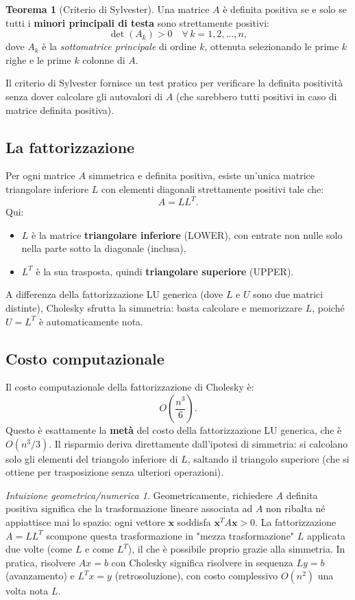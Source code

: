 \documentclass[a4paper,12pt]{article}
\theoremstyle{definition}
\newtheorem{teorema}{Teorema}[section]
\theoremstyle{remark}
\newtheorem*{intuizione}{Intuizione geometrica/numerica}
\begin{document}
\begin{teorema}[Criterio di Sylvester]
Una matrice $A$ è definita positiva se e solo se tutti i \textbf{minori principali di testa} sono
strettamente positivi:
\[
  \det(A_k) > 0 \quad \forall\, k = 1, 2, \ldots, n,
\]
dove $A_k$ è la \emph{sottomatrice principale} di ordine $k$, ottenuta selezionando le prime $k$ righe
e le prime $k$ colonne di $A$.
\end{teorema}

\noindent Il criterio di Sylvester fornisce un test pratico per verificare la definita positività senza
dover calcolare gli autovalori di $A$ (che sarebbero tutti positivi in caso di matrice definita
positiva).

\subsection{La fattorizzazione}

Per ogni matrice $A$ simmetrica e definita positiva, esiste un'unica matrice triangolare inferiore $L$
con elementi diagonali strettamente positivi tale che:
\[
  A = L L^T.
\]
Qui:
\begin{itemize}
  \item $L$ è la matrice \textbf{triangolare inferiore} (LOWER), con entrate non nulle solo nella
    parte sotto la diagonale (inclusa),
  \item $L^T$ è la sua trasposta, quindi \textbf{triangolare superiore} (UPPER).
\end{itemize}
A differenza della fattorizzazione LU generica (dove $L$ e $U$ sono due matrici distinte), Cholesky
sfrutta la simmetria: basta calcolare e memorizzare $L$, poiché $U = L^T$ è automaticamente nota.

\subsection{Costo computazionale}

Il costo computazionale della fattorizzazione di Cholesky è:
\[
  O\!\left(\frac{n^3}{6}\right).
\]
Questo è esattamente la \textbf{metà} del costo della fattorizzazione LU generica, che è
$O(n^3/3)$. Il risparmio deriva direttamente dall'ipotesi di simmetria: si calcolano solo gli
elementi del triangolo inferiore di $L$, saltando il triangolo superiore (che si ottiene per
trasposizione senza ulteriori operazioni).

\begin{intuizione}
Geometricamente, richiedere $A$ definita positiva significa che la trasformazione lineare associata
ad $A$ non ribalta né appiattisce mai lo spazio: ogni vettore $\mathbf{x}$ soddisfa
$\mathbf{x}^T A \mathbf{x} > 0$. La fattorizzazione $A = LL^T$ scompone questa trasformazione in
"mezza trasformazione" $L$ applicata due volte (come $L$ e come $L^T$), il che è possibile proprio
grazie alla simmetria. In pratica, risolvere $Ax = b$ con Cholesky significa risolvere in sequenza
$Ly = b$ (avanzamento) e $L^T x = y$ (retrosoluzione), con costo complessivo $O(n^2)$ una volta
nota $L$.
\end{intuizione}
\end{document}
